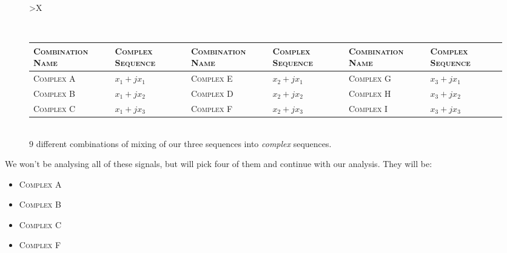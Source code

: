 \documentclass[../../course]{subfiles}
\begin{document}
\begin{figure} [H]
    \centering

    \begin{tabularx} {\textwidth} {
            *{1}{>{\centering\arraybackslash}X}
        }

        \\

        { \begin{tabularx} {\textwidth} {
                *{6}{>{\centering\arraybackslash}X}
            }

            \toprule
            \textsc{Combination Name} & \textsc{Complex Sequence} &
            \textsc{Combination Name} & \textsc{Complex Sequence} &
            \textsc{Combination Name} & \textsc{Complex Sequence} \\
            \midrule

            \textsc{Complex A} & $x_{1} + j x_{1}$ &
            \textsc{Complex E} & $x_{2} + j x_{1}$ &
            \textsc{Complex G} & $x_{3} + j x_{1}$ \\

            \textsc{Complex B} & $x_{1} + j x_{2}$ &
            \textsc{Complex D} & $x_{2} + j x_{2}$ &
            \textsc{Complex H} & $x_{3} + j x_{2}$ \\

            \textsc{Complex C} & $x_{1} + j x_{3}$ &
            \textsc{Complex F} & $x_{2} + j x_{3}$ &
            \textsc{Complex I} & $x_{3} + j x_{3}$ \\

            \bottomrule

        \end{tabularx} } \\

         {
            $9$ different combinations of mixing of our three sequences into \emph{complex}
            sequences.
        }
        \label{tbl:cplxSeqs}
        \\

    \end{tabularx}


\end{figure}

We won't be analysing all of these signals, but will pick four of them and continue with
our analysis. They will be:

\begin{itemize}
    \item \textsc{Complex A}
    \item \textsc{Complex B}
    \item \textsc{Complex C}
    \item \textsc{Complex F}
\end{itemize}
\end{document}

